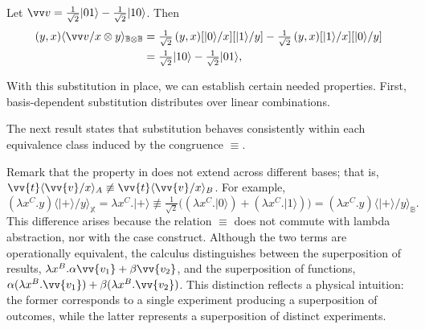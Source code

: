 \documentclass[runningheads,orivec,envcountsame,envcountsect]{llncs}
\providecommand{\qed}{\hbox{\rule{1ex}{1ex}}}%
\newcommand\ket[1]{\ensuremath{|#1\rangle}}
\newcommand\ansubst[2]{\ensuremath{\langle #1 \rangle_{#2}}}
\def\C{\mathbb{C}}            %
\def\Lam#1#2#3{\lambda#1^{#2}{.}#3} %
\newcommand\B{\mathbb B}
\newcommand\XB{\mathbb X}
\begin{document}
\begin{example}
  Let
  $\vv v = \tfrac{1}{\sqrt{2}}\ket{01}
           - \tfrac{1}{\sqrt{2}}\ket{10}$.
  Then 
  \begin{align*}
    (y,x)\ansubst{\vv v/x\otimes y}{\B\otimes\B}
    &= \tfrac{1}{\sqrt{2}}\,(y,x)[\ket{0}/x][\ket{1}/y]
       - \tfrac{1}{\sqrt{2}}\,(y,x)[\ket{1}/x][\ket{0}/y] \\
       &= 
       \tfrac{1}{\sqrt{2}}\ket{10}
       - \tfrac{1}{\sqrt{2}}\ket{01},
     \end{align*}
\end{example}

With this substitution in place, we can establish certain needed properties.
First, basis-dependent substitution distributes over linear combinations.


The next result states that substitution behaves consistently within each
equivalence class induced by the congruence $\equiv$.


Remark that the property in  does not extend across
  different bases; that is,
  $\vv{t}\ansubst{\vv{v}/x}{A}\not\equiv\vv{t}\ansubst{\vv{v}/x}{B}$.
  For example,
  \[
    (\Lam{x}{C}{y})\ansubst{\ket{+}/y}{\XB}
    = \Lam{x}{C}{\ket{+}} 
    \not\equiv
    \tfrac{1}{\sqrt{2}}\big((\Lam{x}{C}{\ket{0}})
    + (\Lam{x}{C}{\ket{1}})\big)
    = (\Lam{x}{C}{y})\ansubst{\ket{+}/y}{\B}.
  \]
  This difference arises because the relation $\equiv$ does not commute with
  lambda abstraction, nor with the case construct. Although the two terms are
  operationally equivalent, the calculus distinguishes between the
  superposition of results,
  $\Lam{x}{B}{\alpha\vv{v_1} + \beta\vv{v_2}}$,
  and the superposition of functions,
  $\alpha(\Lam{x}{B}{\vv{v_1}}) + \beta(\Lam{x}{B}{\vv{v_2}})$.
  This distinction reflects a physical intuition: the former corresponds to a
  single experiment producing a superposition of outcomes, while the latter
  represents a superposition of distinct experiments.
\end{document}
